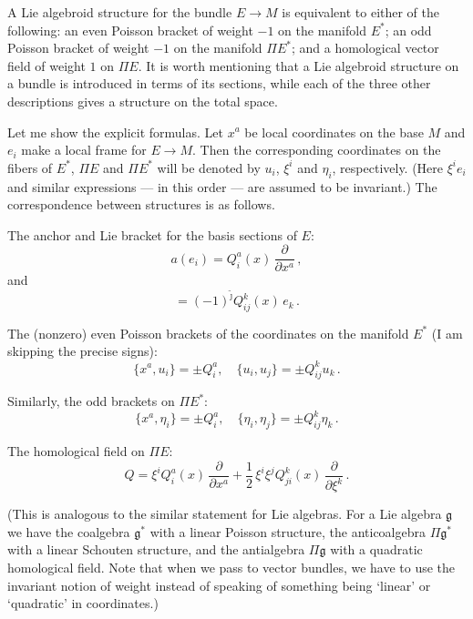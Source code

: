 \documentclass[12pt,reqno,a4paper]{amsart}
\theoremstyle{definition}
\begin{document}
A Lie algebroid structure for the bundle $E\to M$ is equivalent to either of the following: an even Poisson bracket  of weight $-1$ on the manifold $E^*$; an odd Poisson bracket  of weight $-1$ on the manifold $\Pi E^*$; and  a homological vector field  of weight $1$ on $\Pi E$. It is worth mentioning that a Lie algebroid structure on a bundle is introduced in terms of its sections, while each of the three other descriptions gives a structure on the total space.

Let me show the explicit formulas. Let $x^a$ be local coordinates on the base $M$ and $e_i$ make a local frame for $E\to M$. Then the corresponding coordinates on the fibers of $E^*$, $\Pi E$ and $\Pi E^*$ will be denoted by $u_i$, ${{\xi}}^i$ and ${\eta}_i$, respectively. (Here ${{\xi}}^i e_i$ and similar expressions --- in this order --- are assumed to be invariant.) The correspondence between structures is as follows.

The anchor and Lie bracket for the basis sections of $E$:
\begin{equation*}
    a(e_i)=Q_i^a(x)\,{{\frac{\partial {{}}}{\partial {{x^a}}}}}\,,
\end{equation*}
and
\begin{equation*}
    [e_i,e_j]=(-1)^{{\tilde \jmath}} Q_{ij}^k(x)\,e_k\,.
\end{equation*}

The (nonzero) even Poisson brackets  of the coordinates  on the manifold $E^*$ (I am skipping the precise signs):
\begin{equation*}
    \{x^a,u_i\}=\pm Q_i^a, \quad \{u_i,u_j\}=\pm Q_{ij}^k u_k\,.
\end{equation*}

Similarly, the odd brackets on $\Pi E^*$:
\begin{equation*}
    \{x^a,{\eta}_i\}=\pm Q_i^a, \quad \{{\eta}_i,{\eta}_j\}=\pm Q_{ij}^k {\eta}_k\,.
\end{equation*}

The homological field on $\Pi E$:
\begin{equation*}
    Q={{\xi}}^iQ_i^a(x)\,{{\frac{\partial {{}}}{\partial {{x^a}}}}}+\frac{1}{2}\,{{\xi}}^i{{\xi}}^j Q_{ji}^k
    (x)\,{{\frac{\partial {{}}}{\partial {{{{\xi}}^k}}}}}\,.
\end{equation*}

(This is analogous to the similar statement for Lie algebras. For a Lie algebra $\mathfrak{g}$ we have the coalgebra $\mathfrak{g}^*$ with a linear Poisson structure,  the anticoalgebra $\Pi\mathfrak{g}^*$ with a linear Schouten structure, and the antialgebra $\Pi \mathfrak{g}$ with a quadratic homological field. Note that when we pass to vector bundles, we have to use the invariant notion of weight instead of speaking of something being `linear' or `quadratic' in coordinates.)
\end{document}
